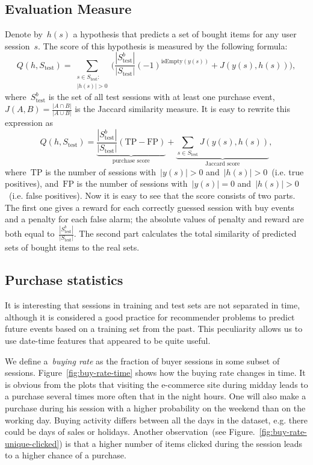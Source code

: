 \documentclass{sig-alternate}
\begin{document}
\subsection{Evaluation Measure}
Denote by~$h(s)$ a hypothesis that predicts a set of bought items for any user session~$s$.
The score of this hypothesis is measured by the following formula:
\[
    Q(h, S_\text{test})
    =
    \sum_{\substack{s \in S_\text{test}: \\ |h(s)| > 0}}
    \Biggl(
        \frac{|S_\text{test}^b|}{|S_\text{test}|}
        (-1)^{\text{isEmpty}(y(s))} + J(y(s), h(s))
    \Biggr),
\]
where~$S_\text{test}^b$ is the set of all test sessions with at least one purchase event,
$J(A, B) = \frac{|A \cap B|}{|A \cup B|}$ is the Jaccard similarity measure.
It is easy to rewrite this expression as
\begin{equation}
\label{eq:score}
    Q(h, S_\text{test})
    =
    \underbrace{
        \frac{|S_\text{test}^b|}{|S_\text{test}|}
        (\text{TP} - \text{FP})
    }_{\text{purchase score}}
    +
    \underbrace{
        \sum_{s \in S_\text{test}}
            J(y(s), h(s))
        }_{\text{Jaccard score}},
\end{equation}
where~$\text{TP}$ is the number of sessions with~$|y(s)| > 0$ and~$|h(s)| > 0$~(i.e. true positives),
and~$\text{FP}$ is the number of sessions with~$|y(s)| = 0$ and~$|h(s)| > 0$~(i.e. false positives).
Now it is easy to see that the score consists of two parts.
The first one gives a reward for each correctly guessed session with buy events
and a penalty for each false alarm; the absolute values of penalty and reward are both equal
to~$\frac{|S_\text{test}^b|}{|S_\text{test}|}$.
The second part calculates the total similarity of predicted sets of bought items to the real sets.


\subsection{Purchase statistics}

It is interesting that sessions in training and test sets are not separated
in time, although it is considered a good practice for recommender problems
to predict future events based on a training set from the past.
This peculiarity allows us to use date-time features that appeared to be quite useful.

We define a~\textit{buying rate} as the fraction of buyer sessions
in some subset of sessions.
Figure~\ref{fig:buy-rate-time} shows how the buying rate changes in time.
It is obvious from the plots that visiting the e-commerce site during midday
leads to a purchase several times more often that in the night hours.
One will also make a purchase during his session with a higher probability on the weekend than on the working day.
Buying activity differs between all the days in the dataset,
e.g. there could be days of sales or holidays.
Another observation~(see Figure.~\ref{fig:buy-rate-unique-clicked}) is that a higher number of items clicked
during the session leads to a higher chance of a purchase.
\end{document}
